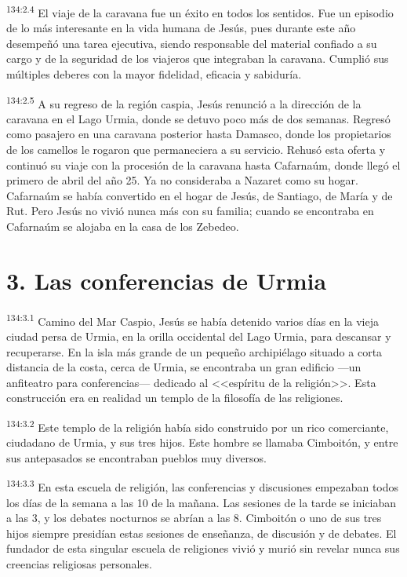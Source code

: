 \par 
\textsuperscript{134:2.4} El viaje de la caravana fue un éxito en todos los sentidos. Fue un episodio de lo más interesante en la vida humana de Jesús, pues durante este año desempeñó una tarea ejecutiva, siendo responsable del material confiado a su cargo y de la seguridad de los viajeros que integraban la caravana. Cumplió sus múltiples deberes con la mayor fidelidad, eficacia y sabiduría.

\par 
\textsuperscript{134:2.5} A su regreso de la región caspia, Jesús renunció a la dirección de la caravana en el Lago Urmia, donde se detuvo poco más de dos semanas. Regresó como pasajero en una caravana posterior hasta Damasco, donde los propietarios de los camellos le rogaron que permaneciera a su servicio. Rehusó esta oferta y continuó su viaje con la procesión de la caravana hasta Cafarnaúm, donde llegó el primero de abril del año 25. Ya no consideraba a Nazaret como su hogar. Cafarnaúm se había convertido en el hogar de Jesús, de Santiago, de María y de Rut. Pero Jesús no vivió nunca más con su familia; cuando se encontraba en Cafarnaúm se alojaba en la casa de los Zebedeo.

\section*{3. Las conferencias de Urmia}
\par 
\textsuperscript{134:3.1} Camino del Mar Caspio, Jesús se había detenido varios días en la vieja ciudad persa de Urmia, en la orilla occidental del Lago Urmia, para descansar y recuperarse. En la isla más grande de un pequeño archipiélago situado a corta distancia de la costa, cerca de Urmia, se encontraba un gran edificio ---un anfiteatro para conferencias--- dedicado al <<espíritu de la religión>>. Esta construcción era en realidad un templo de la filosofía de las religiones.

\par 
\textsuperscript{134:3.2} Este templo de la religión había sido construido por un rico comerciante, ciudadano de Urmia, y sus tres hijos. Este hombre se llamaba Cimboitón, y entre sus antepasados se encontraban pueblos muy diversos.

\par 
\textsuperscript{134:3.3} En esta escuela de religión, las conferencias y discusiones empezaban todos los días de la semana a las 10 de la mañana. Las sesiones de la tarde se iniciaban a las 3, y los debates nocturnos se abrían a las 8. Cimboitón o uno de sus tres hijos siempre presidían estas sesiones de enseñanza, de discusión y de debates. El fundador de esta singular escuela de religiones vivió y murió sin revelar nunca sus creencias religiosas personales.

